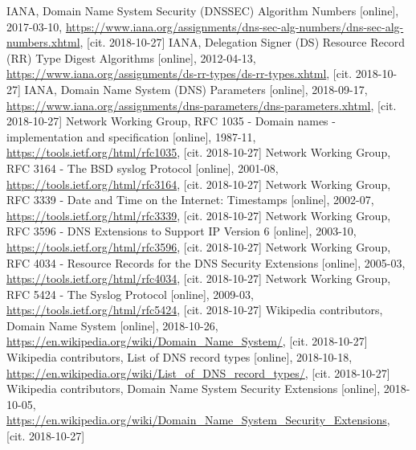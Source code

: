 \documentclass[11pt, a4paper, titlepage]{article}
\begin{document}
\newpage


\renewcommand{\refname}{Zdroje}
\begin{thebibliography}{9}
    IANA,
    Domain Name System Security (DNSSEC) Algorithm Numbers [online],
    2017-03-10,
    \url{https://www.iana.org/assignments/dns-sec-alg-numbers/dns-sec-alg-numbers.xhtml},
    [cit. 2018-10-27]
    IANA,
    Delegation Signer (DS) Resource Record (RR) Type Digest Algorithms [online],
    2012-04-13,
    \url{https://www.iana.org/assignments/ds-rr-types/ds-rr-types.xhtml},
    [cit. 2018-10-27]
    IANA,
    Domain Name System (DNS) Parameters [online],
    2018-09-17,
    \url{https://www.iana.org/assignments/dns-parameters/dns-parameters.xhtml},
    [cit. 2018-10-27]
    Network Working Group,
    RFC 1035 - Domain names - implementation and specification [online],
    1987-11,
    \url{https://tools.ietf.org/html/rfc1035},
    [cit. 2018-10-27]
    Network Working Group,
    RFC 3164 - The BSD syslog Protocol [online],
    2001-08,
    \url{https://tools.ietf.org/html/rfc3164},
    [cit. 2018-10-27]
    Network Working Group,
    RFC 3339 - Date and Time on the Internet: Timestamps [online],
    2002-07,
    \url{https://tools.ietf.org/html/rfc3339},
    [cit. 2018-10-27]
    Network Working Group,
    RFC 3596 - DNS Extensions to Support IP Version 6 [online],
    2003-10,
    \url{https://tools.ietf.org/html/rfc3596},
    [cit. 2018-10-27]
    Network Working Group,
    RFC 4034 - Resource Records for the DNS Security Extensions [online],
    2005-03,
    \url{https://tools.ietf.org/html/rfc4034},
    [cit. 2018-10-27]
    Network Working Group,
    RFC 5424 - The Syslog Protocol [online],
    2009-03,
    \url{https://tools.ietf.org/html/rfc5424},
    [cit. 2018-10-27]
    Wikipedia contributors,
    Domain Name System [online],
    2018-10-26,
    \url{https://en.wikipedia.org/wiki/Domain_Name_System/},
    [cit. 2018-10-27]
    Wikipedia contributors,
    List of DNS record types [online],
    2018-10-18,
    \url{https://en.wikipedia.org/wiki/List_of_DNS_record_types/},
    [cit. 2018-10-27]
    Wikipedia contributors,
    Domain Name System Security Extensions [online],
    2018-10-05,
    \url{https://en.wikipedia.org/wiki/Domain_Name_System_Security_Extensions},
    [cit. 2018-10-27]

\end{thebibliography}
\end{document}

